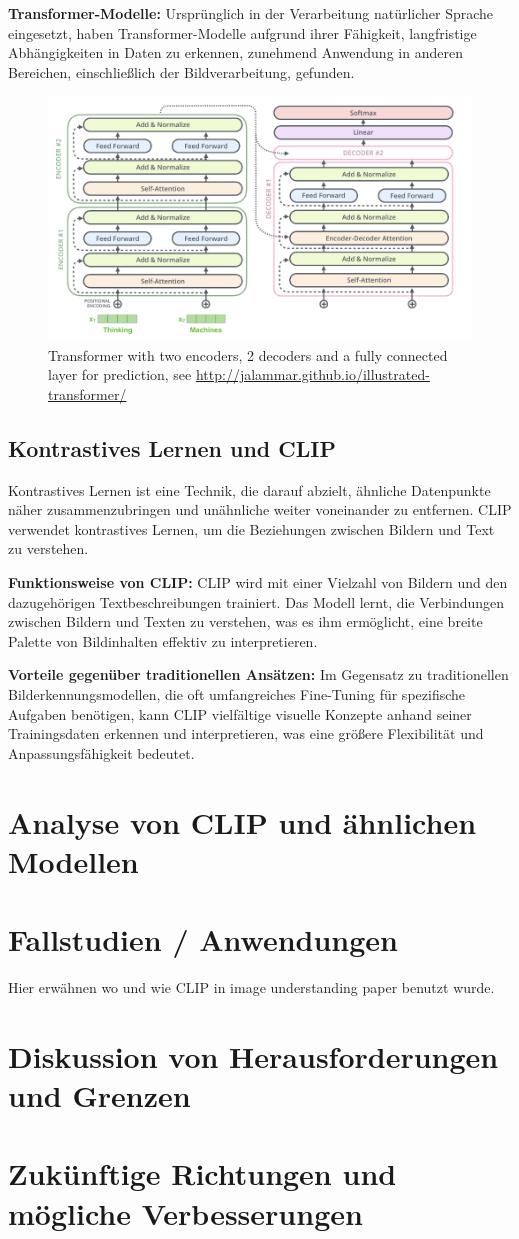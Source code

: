 \documentclass[nolibertine, ngerman]{ttlab-qualify}
\begin{document}
\textbf{Transformer-Modelle:} Ursprünglich in der Verarbeitung natürlicher Sprache eingesetzt, haben Transformer-Modelle aufgrund ihrer Fähigkeit, langfristige Abhängigkeiten in Daten zu erkennen, zunehmend Anwendung in anderen Bereichen, einschließlich der Bildverarbeitung, gefunden.
\begin{figure}[h]
	\centering
	\includegraphics[scale=0.5]{static/transformer.png}
	\caption{Transformer with two encoders, 2 decoders and a fully connected layer for prediction, see \url{http://jalammar.github.io/illustrated-transformer/}}
	\label{fig:2.3}
\end{figure}

\subsection{Kontrastives Lernen und CLIP}
Kontrastives Lernen ist eine Technik, die darauf abzielt, ähnliche Datenpunkte näher zusammenzubringen und unähnliche weiter voneinander zu entfernen. CLIP verwendet kontrastives Lernen, um die Beziehungen zwischen Bildern und Text zu verstehen.

\textbf{Funktionsweise von CLIP:} CLIP wird mit einer Vielzahl von Bildern und den dazugehörigen Textbeschreibungen trainiert. Das Modell lernt, die Verbindungen zwischen Bildern und Texten zu verstehen, was es ihm ermöglicht, eine breite Palette von Bildinhalten effektiv zu interpretieren.

\textbf{Vorteile gegenüber traditionellen Ansätzen:} Im Gegensatz zu traditionellen Bilderkennungsmodellen, die oft umfangreiches Fine-Tuning für spezifische Aufgaben benötigen, kann CLIP vielfältige visuelle Konzepte anhand seiner Trainingsdaten erkennen und interpretieren, was eine größere Flexibilität und Anpassungsfähigkeit bedeutet.
\section{Analyse von CLIP und ähnlichen Modellen}
\section{Fallstudien / Anwendungen}
Hier erwähnen wo und wie CLIP in image understanding paper benutzt wurde.
\section{Diskussion von Herausforderungen und Grenzen}
\section{Zukünftige Richtungen und mögliche Verbesserungen}

\printbibliography
\appendix
\end{document}
